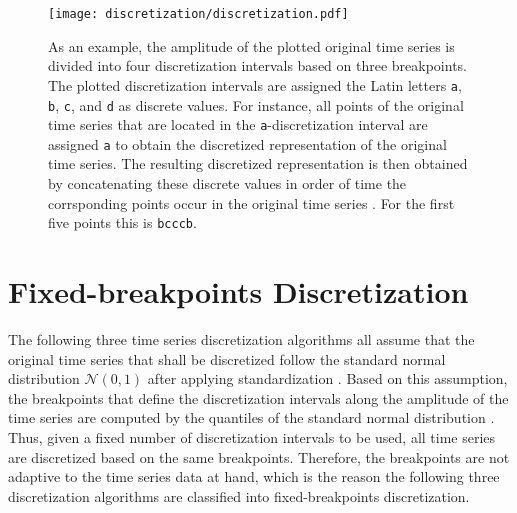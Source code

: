 \begin{figure}[htb]
\centering
\texttt{[image: discretization/discretization.pdf]}
\caption[Time Series Discretization - Basic Idea]{As an example, the amplitude of the plotted original time series is divided into four discretization intervals based on three breakpoints. The plotted discretization intervals are assigned the Latin letters \texttt{a}, \texttt{b}, \texttt{c}, and \texttt{d} as discrete values. For instance, all points of the original time series that are located in the \texttt{a}-discretization interval are assigned \texttt{a} to obtain the discretized representation of the original time series. The resulting discretized representation is then obtained by concatenating these discrete values in order of time the corrsponding points occur in the original time series \cite{Survey_Temporal_Discretization}. For the first five points this is \texttt{b}\texttt{c}\texttt{c}\texttt{c}\texttt{b}.}
\label{fig:time_series_discretization}
\end{figure}

\newpage
\section{Fixed-breakpoints Discretization}
The following three time series discretization algorithms all assume that the original time series that shall be discretized follow the standard normal distribution $\mathcal{N}(0,1)$ after applying standardization \cite{SAX_Lin}. Based on this assumption, the breakpoints that define the discretization intervals along the amplitude of the time series are computed by the quantiles of the standard normal distribution \cite{SAX_Lin}. Thus, given a fixed number of discretization intervals to be used, all time series are discretized based on the same breakpoints. Therefore, the breakpoints are not adaptive to the time series data at hand, which is the reason the following three discretization algorithms are classified into fixed-breakpoints discretization.
\newpage




\pagebreak
